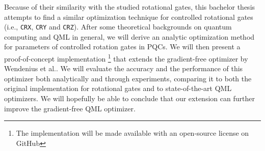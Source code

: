 Because of their similarity with the studied rotational gates, this bachelor
thesis attempts to find a similar optimization technique for controlled
rotational gates (i.e., \texttt{CRX}, \texttt{CRY} and \texttt{CRZ}).
After some theoretical backgrounds on quantum computing and QML in general, we
will derive an analytic optimization method for parameters of controlled
rotation gates in PQCs.
We will then present a proof-of-concept implementation
\footnote{The implementation will be made available with an open-source license
on GitHub}
that extends the gradient-free optimizer by Wendenius et al..
We will evaluate the accuracy and the performance of this optimizer both
analytically and through experiments, comparing it to both the original
implementation for rotational gates and to state-of-the-art QML optimizers.
We will hopefully be able to conclude that our extension can further improve the
gradient-free QML optimizer.
